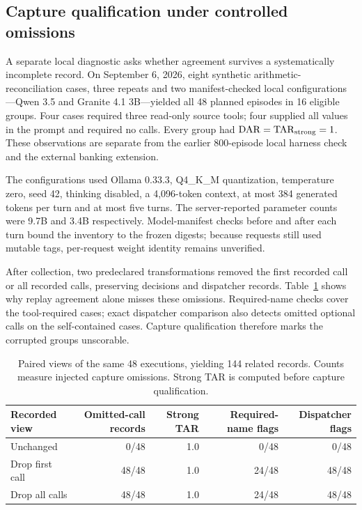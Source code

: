 \subsection{Capture qualification under controlled omissions}
\label{sec:capture-diagnostic}

A separate local diagnostic asks whether agreement survives a systematically
incomplete record. On September 6, 2026, eight synthetic
arithmetic-reconciliation cases, three repeats and two manifest-checked local
configurations---Qwen 3.5 and Granite 4.1 3B---yielded all 48 planned episodes
in 16 eligible groups. Four cases required three read-only source tools; four
supplied all values in the prompt and required no calls. Every group had
\(\mathrm{DAR}=\mathrm{TAR}_{\mathrm{strong}}=1\). These observations are separate from the earlier
800-episode local harness check and the external banking extension.

The configurations used Ollama 0.33.3, Q4\_K\_M quantization, temperature zero,
seed 42, thinking disabled, a 4,096-token context, at most 384 generated tokens
per turn and at most five turns. The server-reported parameter counts were
9.7B and 3.4B respectively. Model-manifest checks before and after each turn
bound the inventory to the frozen digests; because requests still used mutable
tags, per-request weight identity remains unverified.

After collection, two predeclared transformations removed the first recorded
call or all recorded calls, preserving decisions and dispatcher records.
Table~\ref{tab:capture-loss} shows why replay agreement alone misses these
omissions. Required-name checks cover the tool-required cases; exact dispatcher
comparison also detects omitted optional calls on the self-contained cases.
Capture qualification therefore marks the corrupted groups unscorable.

\begin{table}[htbp]
\centering
\small
\caption{Paired views of the same 48 executions, yielding 144 related records.
Counts measure injected capture omissions. Strong TAR is computed before
capture qualification.}
\label{tab:capture-loss}
\begin{tabular}{@{}lrrrr@{}}
\toprule
Recorded view & Omitted-call records & Strong TAR & Required-name flags & Dispatcher flags \\
\midrule
Unchanged & 0/48 & 1.0 & 0/48 & 0/48 \\
Drop first call & 48/48 & 1.0 & 24/48 & 48/48 \\
Drop all calls & 48/48 & 1.0 & 24/48 & 48/48 \\
\bottomrule
\end{tabular}
\end{table}

